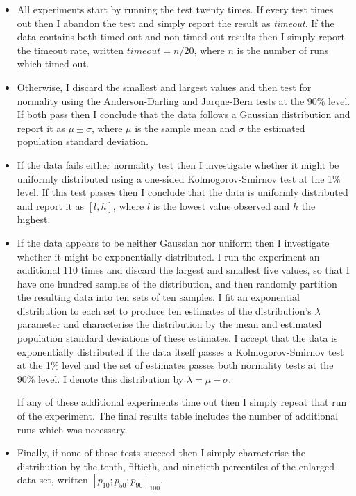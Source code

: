 \begin{itemize}
\item All experiments start by running the test twenty times.  If
  every test times out then I abandon the test and simply report the
  result as \textit{timeout}.  If the data contains both timed-out and
  non-timed-out results then I simply report the timeout rate, written
  $timeout = n/20$, where $n$ is the number of runs which timed out.
\item Otherwise, I discard the smallest and largest values and then
  test for normality using the Anderson-Darling and Jarque-Bera
  tests at the 90\% level.  If both pass then I conclude that the
  data follows a Gaussian distribution and report it as $\mu \pm \sigma$,
  where $\mu$ is the sample mean and $\sigma$ the estimated population
  standard deviation.
\item If the data fails either normality test then I investigate
  whether it might be uniformly distributed using a one-sided
  Kolmogorov-Smirnov test at the 1\% level.  If this test passes then I conclude that the
  data is uniformly distributed and report it as $[l, h]$, where $l$
  is the lowest value observed and $h$ the highest.
\item If the data appears to be neither Gaussian nor
  uniform then I investigate whether it might be exponentially
  distributed.  I run the experiment an additional 110 times and
  discard the largest and smallest five values, so that I have one
  hundred samples of the distribution, and then randomly partition the
  resulting data into ten sets of ten samples.  I fit an exponential
  distribution to each set to produce ten estimates of the
  distribution's $\lambda$ parameter and characterise the distribution by the mean and
  estimated population standard deviations of these estimates.  I
  accept that the data is exponentially distributed if the data itself
  passes a Kolmogorov-Smirnov test at the 1\% level and the set of
  estimates passes both normality tests at the 90\% level.  I denote
  this distribution by $\lambda = \mu \pm \sigma$.

  If any of these additional experiments time out then I simply repeat
  that run of the experiment.  The final results table includes the
  number of additional runs which was necessary.

\item Finally, if none of those tests succeed then I simply
  characterise the distribution by the tenth, fiftieth, and ninetieth
  percentiles of the enlarged data set, written $[p_{10}; p_{50};
    p_{90}]_{100}$.
\end{itemize}

